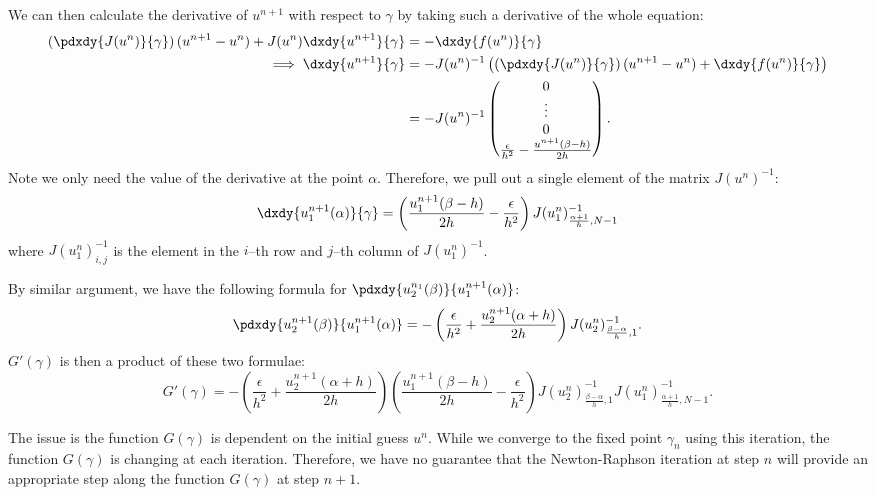 \documentclass{book}
\begin{document}
We can then calculate the derivative of $u^{n+1}$ with respect to $\gamma$ by taking such a derivative of the whole equation:
\begin{align*}
\left ( \pdxdy{J(u^n)}{\gamma} \right ) (u^{n+1} - u^n) + J(u^n) \dxdy{u^{n+1}}{\gamma} & = - \dxdy{f(u^n)}{\gamma} \\
\implies \dxdy{u^{n+1}}{\gamma} & = -J(u^n)^{-1} \left ( \left ( \pdxdy{J(u^n)}{\gamma} \right ) (u^{n+1} - u^n) + \dxdy{f(u^n)}{\gamma} \right ) \\
& = -J(u^n)^{-1} \begin{pmatrix} 0 \\ \vdots \\ 0 \\ \frac{\epsilon}{h^2} - \frac{u^{n+1}(\beta-h)}{2h} \end{pmatrix} .
\end{align*}
Note we only need the value of the derivative at the point $\alpha$.
Therefore, we pull out a single element of the matrix $J(u^n)^{-1}$:
\begin{equation*}
\dxdy{u^{n+1}_1(\alpha)}{\gamma} = \left ( \frac{u^{n+1}_1(\beta-h)}{2h} - \frac{\epsilon}{h^2} \right ) J(u^n_1)^{-1}_{\frac{\alpha+1}{h},N-1}
\end{equation*}
where $J(u^n_1)^{-1}_{i,j}$ is the element in the $i$--th row and $j$--th column of $J(u^n_1)^{-1}$.

By similar argument, we have the following formula for $\pdxdy{u^{n_1}_2(\beta)}{u^{n+1}_1(\alpha)}$:
\begin{equation*}
\pdxdy{u^{n+1}_2(\beta)}{u^{n+1}_1(\alpha)} = -\left(\frac{\epsilon}{h^2} + \frac{u^{n+1}_2(\alpha+h)}{2h} \right) J(u^n_2)^{-1}_{\frac{\beta-\alpha}{h}, 1} .
\end{equation*}
$G'(\gamma)$ is then a product of these two formulae:
\begin{equation*}
G'(\gamma) = -\left(\frac{\epsilon}{h^2} + \frac{u^{n+1}_2(\alpha+h)}{2h} \right) \left ( \frac{u^{n+1}_1(\beta-h)}{2h} - \frac{\epsilon}{h^2} \right ) J(u^n_2)^{-1}_{\frac{\beta-\alpha}{h}, 1} J(u^n_1)^{-1}_{\frac{\alpha+1}{h},N-1} .
\end{equation*}

The issue is the function $G(\gamma)$ is dependent on the initial guess $u^n$.
While we converge to the fixed point $\gamma_n$ using this iteration, the function $G(\gamma)$ is changing at each iteration.
Therefore, we have no guarantee that the Newton-Raphson iteration at step $n$ will provide an appropriate step along the function $G(\gamma)$ at step $n+1$.
\end{document}
